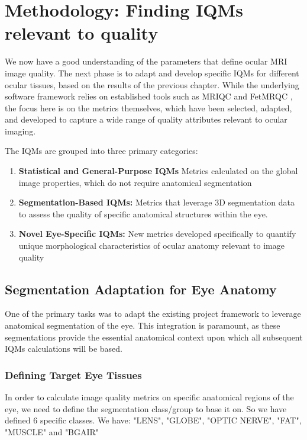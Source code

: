 \chapter{Methodology: Finding IQMs relevant to quality}
\label{chap:methodology}
We now have a good understanding of the parameters that define ocular MRI image quality. The next phase is to adapt and develop specific IQMs for different ocular tissues, based on the results of the previous chapter. While the underlying software framework relies on established tools such as MRIQC \cite{esteban_mriqc_2017} and FetMRQC \cite{noauthor_medical-image-analysis-laboratoryfetmrqc_sr_nodate}, the focus here is on the metrics themselves, which have been selected, adapted, and developed to capture a wide range of quality attributes relevant to ocular imaging.

The IQMs are grouped into three primary categories:
\begin{enumerate}
    \item \textbf{Statistical and General-Purpose IQMs} Metrics calculated on the global image properties, which do not require anatomical segmentation
    \item \textbf{Segmentation-Based IQMs:} Metrics that leverage 3D segmentation data to assess the quality of specific anatomical structures within the eye.
    \item \textbf{Novel Eye-Specific IQMs:} New metrics developed specifically to quantify unique morphological characteristics of ocular anatomy relevant to image quality
\end{enumerate}

\section{Segmentation Adaptation for Eye Anatomy}
\label{sec:seg_adaptation}
One of the primary tasks was to adapt the existing project framework to leverage anatomical segmentation of the eye. This integration is paramount, as these segmentations provide the essential anatomical context upon which all subsequent IQMs calculations will be based.

\subsection{Defining Target Eye Tissues}
\label{ssec:target_tissues}
In order to calculate image quality metrics on specific anatomical regions of the eye, we need to define the segmentation class/group to base it on. So we have defined 6 specific classes. We have: "LENS", "GLOBE", "OPTIC NERVE", "FAT", "MUSCLE" and "BGAIR"

